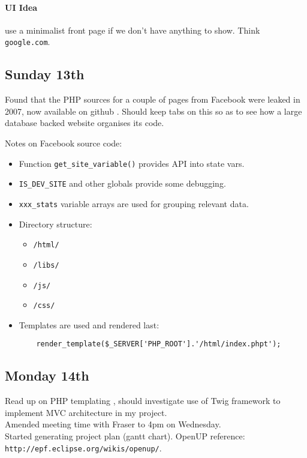 \paragraph{UI Idea} use a minimalist front page if we don’t have anything to
show. Think \texttt{google.com}.

\subsection{Sunday 13th}
Found that the PHP sources for a couple of pages from Facebook were leaked in
2007, now available on github \cite{Buvrilovic2013}. Should keep tabs on this so
as to see how a large database backed website organises its code.

\noindent
Notes on Facebook source code:
\begin{itemize}
\item Function \texttt{get\_site\_variable()} provides API into state vars.
\item \texttt{IS\_DEV\_SITE} and other globals provide some debugging.
\item \texttt{xxx\_stats} variable arrays are used for grouping relevant data.
\item Directory structure:
  \begin{itemize}
  \item \texttt{/html/}
  \item \texttt{/libs/}
  \item \texttt{/js/}
  \item \texttt{/css/}
  \end{itemize}
\item Templates are used and rendered last:
\begin{verbatim}
    render_template($_SERVER['PHP_ROOT'].'/html/index.phpt');
\end{verbatim}
\end{itemize}

\subsection{Monday 14th}
Read up on PHP templating \cite{Rakowski2011}, should investigate use of Twig
framework to implement MVC architecture in my project.\\

Amended meeting time with Fraser to 4pm on Wednesday.\\

Started generating project plan (gantt chart). OpenUP reference:
\texttt{http://epf.eclipse.org/wikis/openup/}.

